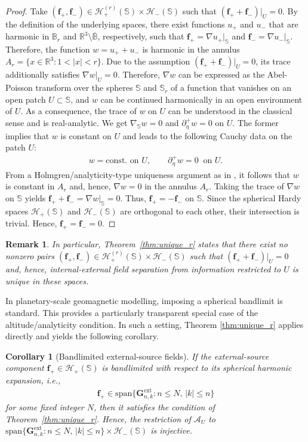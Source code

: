 \documentclass[a4paper, 11pt]{article}
\newtheorem{corollary}[theorem]{Corollary}
\newtheorem{remark}[theorem]{Remark}
\renewcommand{\SS}{\mathbb{S}}
\newcommand{\BB}{\mathbb{B}}
\newcommand{\R}{\mathbb{R}}
\newcommand{\f}{\mathbf{f}}
\begin{document}
\begin{proof}
Take $(\f_+,\f_-)\in \mathcal H^{(r)}_+(\SS)\times \mathcal H_-(\SS)$ such that $(\f_+ + \f_-)|_U=0$. By the definition of the underlying spaces, there exist functions $u_+$ and $u_-$ that are harmonic in $\BB_r$ and $\R^3\setminus\overline{\BB}$, respectively, such that $\f_+=\nabla u_+|_\SS$ and $\f_-=\nabla u_-|_\SS$. Therefore, the function $w=u_++u_-$ is harmonic in the annulus $A_r=\{x\in \R^3:1<|x|<r\}$. 
Due to the assumption $(\f_+ + \f_-)|_U=0$, its trace additionally satisfies $\nabla w|_U=0$. 
Therefore, $\nabla w$ can be expressed as the Abel-Poisson transform over the spheres $\SS$ and $\SS_r$ of a function that vanishes on an open patch $U\subset\SS$, and $w$ can be continued harmonically in an open environment of $U$. As a consequence, the trace of $w$ on $U$ can be understood in the classical sense and is real-analytic. We get $\nabla_\SS w=0$ and $\partial_\eta^+ w=0$ on $U$. The former implies that $w$ is constant on $U$ and leads to the following Cauchy data on the patch $U$:
\begin{align}
w=\text{const. on }U,\qquad \partial_\eta^+ w=0\ \text{ on }U .
\end{align}
From a Holmgren/analyticity-type uniqueness argument as in \cite[Lemma~1]{atfeh10}, it follows that $w$ is constant in $A_r$ and, hence, $\nabla w= 0$ in the annulus $A_r$. Taking the trace of $\nabla w$ on $\SS$ yields $\f_++\f_-=\nabla w|_\SS=0$. Thus, $\f_+=-\f_-$ on $\SS$. Since the spherical Hardy spaces $\mathcal H_+(\SS)$ and $\mathcal H_-(\SS)$ are orthogonal to each other, their intersection is trivial. Hence, $\f_+=\f_-=0$.
\end{proof}

\begin{remark}
	In particular, Theorem~\ref{thm:unique_r} states that there exist \emph{no} nonzero pairs $(\f_+,\f_-)\in \mathcal H_+^{(r)}(\SS)\times \mathcal H_-(\SS)$ such that $(\f_+ + \f_-)|_U = 0$ and, hence, internal-external field separation from information restricted to $U$ is unique in these spaces.
\end{remark}

In planetary-scale geomagnetic modelling, imposing a spherical bandlimit is standard. This provides a particularly transparent special case of the altitude/analyticity condition. In such a setting, Theorem \ref{thm:unique_r} applies directly and yields the following corollary.

\begin{corollary}[Bandlimited external-source fields]\label{cor:bandlimited}
If the external-source component $\f_+\in\mathcal H_+(\SS)$ is bandlimited with respect to its spherical harmonic expansion, i.e.,
\begin{align*}
 \f_+  \in \mathrm{span}\{\mathbf G^{\mathrm{ext}}_{n,k}: n\leq N,\,|k|\leq n\} 
\end{align*}
for some fixed integer $N$, then it satisfies the condition of Theorem~\ref{thm:unique_r}. Hence,  the restriction of $\mathcal A_{U}$ to $\mathrm{span}\{\mathbf G^{\mathrm{ext}}_{n,k}: n\leq N,\,|k|\leq n\}\times \mathcal H_{-}(\SS)$ is injective.
\end{corollary}
\end{document}
